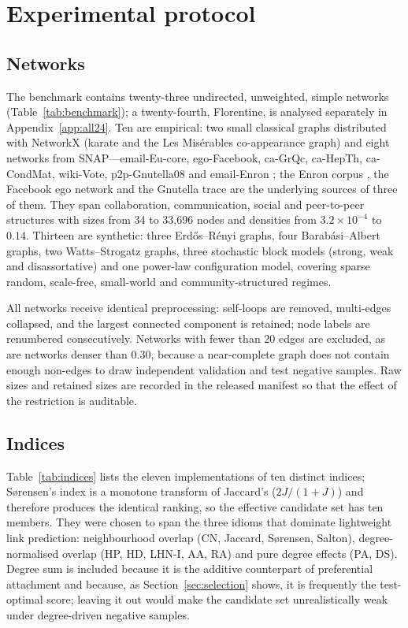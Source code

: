 \documentclass{comjnl}
\begin{document}
\section{Experimental protocol}
\label{sec:protocol}

\subsection{Networks}
\label{sec:networks}

The benchmark contains twenty-three undirected, unweighted, simple networks (Table~\ref{tab:benchmark}); a twenty-fourth, Florentine, is analysed separately in Appendix~\ref{app:all24}. Ten are empirical: two small classical graphs distributed with NetworkX (karate and the Les Mis\'erables co-appearance graph) and eight networks from SNAP---email-Eu-core, ego-Facebook, ca-GrQc, ca-HepTh, ca-CondMat, wiki-Vote, p2p-Gnutella08 and email-Enron \citep{leskovec2014snap}; the Enron corpus \citep{klimt2004enron}, the Facebook ego network \citep{mcauley2014discovering} and the Gnutella trace \citep{ripeanu2002mapping} are the underlying sources of three of them. They span collaboration, communication, social and peer-to-peer structures with sizes from 34 to 33{,}696 nodes and densities from $3.2\times10^{-4}$ to $0.14$. Thirteen are synthetic: three Erd\H{o}s--R\'enyi graphs, four Barab\'asi--Albert graphs, two Watts--Strogatz graphs, three stochastic block models (strong, weak and disassortative) and one power-law configuration model, covering sparse random, scale-free, small-world and community-structured regimes.

All networks receive identical preprocessing: self-loops are removed, multi-edges collapsed, and the largest connected component is retained; node labels are renumbered consecutively. Networks with fewer than 20 edges are excluded, as are networks denser than 0.30, because a near-complete graph does not contain enough non-edges to draw independent validation and test negative samples. Raw sizes and retained sizes are recorded in the released manifest so that the effect of the restriction is auditable.


\subsection{Indices}

Table~\ref{tab:indices} lists the eleven implementations of ten distinct indices; S\o{}rensen's index is a monotone transform of Jaccard's ($2J/(1+J)$) and therefore produces the identical ranking, so the effective candidate set has ten members. They were chosen to span the three idioms that dominate lightweight link prediction: neighbourhood overlap (CN, Jaccard, S{\o}rensen, Salton), degree-normalised overlap (HP, HD, LHN-I, AA, RA) and pure degree effects (PA, DS). Degree sum is included because it is the additive counterpart of preferential attachment and because, as Section~\ref{sec:selection} shows, it is frequently the test-optimal score; leaving it out would make the candidate set unrealistically weak under degree-driven negative samples.
\end{document}
